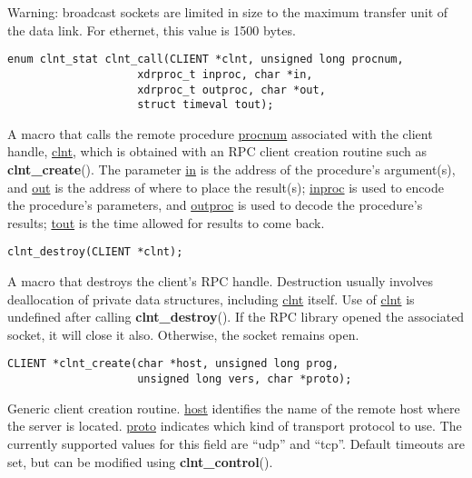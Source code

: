 \documentclass[]{article}
\let\realtextbf=\textbf
\renewcommand{\textbf}[1]{\textcolor{boldcolor}{\realtextbf{#1}}}
\renewcommand{\emph}[1]{\underline{#1}}
\begin{document}
\begin{description}
\itemsep1pt\parskip0pt
\item[]
Warning: broadcast sockets are limited in size to the maximum transfer
unit of the data link. For ethernet, this value is 1500 bytes.
\end{description}

\begin{verbatim}
enum clnt_stat clnt_call(CLIENT *clnt, unsigned long procnum,
                    xdrproc_t inproc, char *in,
                    xdrproc_t outproc, char *out,
                    struct timeval tout);
\end{verbatim}

\begin{description}
\itemsep1pt\parskip0pt
\item[]
A macro that calls the remote procedure \emph{procnum} associated with
the client handle, \emph{clnt}, which is obtained with an RPC client
creation routine such as \textbf{clnt\_create}(). The parameter
\emph{in} is the address of the procedure's argument(s), and \emph{out}
is the address of where to place the result(s); \emph{inproc} is used to
encode the procedure's parameters, and \emph{outproc} is used to decode
the procedure's results; \emph{tout} is the time allowed for results to
come back.
\end{description}

\begin{verbatim}
clnt_destroy(CLIENT *clnt);
\end{verbatim}

\begin{description}
\itemsep1pt\parskip0pt
\item[]
A macro that destroys the client's RPC handle. Destruction usually
involves deallocation of private data structures, including \emph{clnt}
itself. Use of \emph{clnt} is undefined after calling
\textbf{clnt\_destroy}(). If the RPC library opened the associated
socket, it will close it also. Otherwise, the socket remains open.
\end{description}

\begin{verbatim}
CLIENT *clnt_create(char *host, unsigned long prog,
                    unsigned long vers, char *proto);
\end{verbatim}

\begin{description}
\itemsep1pt\parskip0pt
\item[]
Generic client creation routine. \emph{host} identifies the name of the
remote host where the server is located. \emph{proto} indicates which
kind of transport protocol to use. The currently supported values for
this field are ``udp'' and ``tcp''. Default timeouts are set, but can be
modified using \textbf{clnt\_control}().
\end{description}
\end{document}
